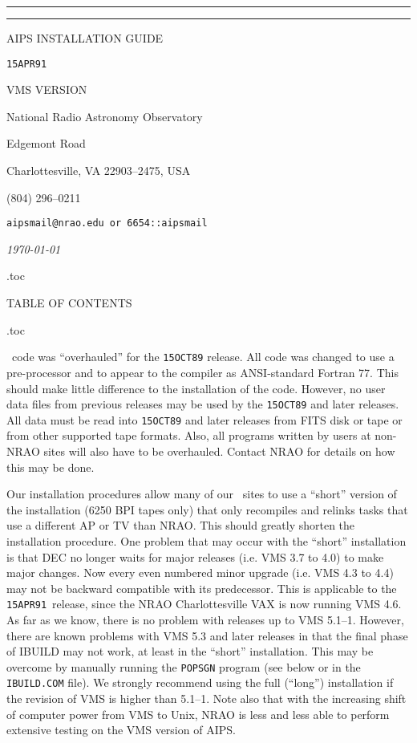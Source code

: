 \def\noheadline{\headline={\hfil}
                \footline={\hss\folio\hss}}
\def\doctitle{}					%
\def\title#1{\def\doctitle{#1}}			%
\def\example#1{\line{\tentt\hskip 2cm {#1}\hfil}} %

\title{\aips\ \it Installation Guide}
\hrule height2pt \vskip 2pt \hrule \vskip 2cm
\centerline{\bigbold AIPS INSTALLATION GUIDE}
\bigskip
\def\THISVER{{\tt 15APR91}}
\def\OLDVER{{\tt 15JAN91}}
\centerline{\THISVER}
\bigskip
\centerline{VMS VERSION}
\bigskip\bigskip
\centerline{National Radio Astronomy Observatory}
\centerline{Edgemont Road}
\centerline{Charlottesville, VA 22903--2475, USA}
\centerline{(804) 296--0211}
\centerline{\tt aipsmail@nrao.edu \rm or \tt 6654::aipsmail}
\bigskip
\centerline{\sl \today}
\vfill\eject
\newwrite\contfile
\contents %
  \immediate\openout\contfile \jobname.toc
\else
  \ \bigskip\centerline{TABLE OF CONTENTS}\bigskip
  \jobname.toc
\fi
\vfill\eject{}

\aips\ code was ``overhauled'' for the {\tt 15OCT89} release.  All code was
changed to use a pre-processor and to appear to the compiler as
ANSI-standard Fortran 77.  This should make little difference to the
installation of the code.  However, no user data files from previous
releases may be used by the {\tt 15OCT89} and later releases.  All data must
be read into {\tt 15OCT89} and later releases from FITS disk or tape or from
other supported tape formats.  Also, all programs written by users at
non-NRAO sites will also have to be overhauled.  Contact NRAO for
details on how this may be done.


Our installation procedures allow many of our \aips\ sites to use a
``short'' version of the installation (6250 BPI tapes only) that only
recompiles and relinks tasks that use a different AP or TV than NRAO.
This should greatly shorten the installation procedure.  One problem
that may occur with the ``short'' installation is that DEC no longer
waits for major releases (i.e. VMS 3.7 to 4.0) to make major changes.
Now every even numbered minor upgrade (i.e. VMS 4.3 to 4.4) may not be
backward compatible with its predecessor.  This is applicable to the
\THISVER\ release, since the NRAO Charlottesville VAX is now running VMS
4.6.  As far as we know, there is no problem with releases up to VMS
5.1--1.  However, there are known problems with VMS 5.3 and later
releases in that the final phase of IBUILD may not work, at least in
the ``short'' installation.  This may be overcome by manually running
the {\tt POPSGN} program (see below or in the {\tt IBUILD.COM} file).
We strongly recommend using the full (``long'') installation if the
revision of VMS is higher than 5.1--1.  Note also that with the
increasing shift of computer power from VMS to Unix, NRAO is less and
less able to perform extensive testing on the VMS version of AIPS.

